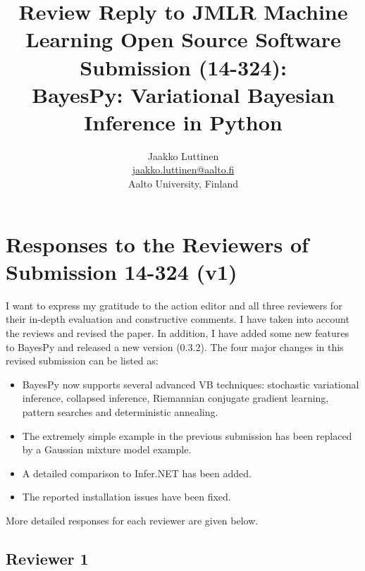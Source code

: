 \documentclass{article}
\title{Review Reply to JMLR Machine Learning Open Source Software Submission (14-324):\\
BayesPy: Variational Bayesian Inference in Python}
\author{Jaakko Luttinen\\
  \url{jaakko.luttinen@aalto.fi}\\
    Aalto University, Finland}
\begin{document}
\maketitle

\section{Responses to the Reviewers of Submission 14-324 (v1)}

I want to express my gratitude to the action editor and all three reviewers for
their in-depth evaluation and constructive comments.  I have taken into account
the reviews and revised the paper.  In addition, I have added some new features
to BayesPy and released a new version (0.3.2).  The four major changes in this
revised submission can be listed as:
\begin{itemize}

\item BayesPy now supports several advanced VB techniques: stochastic
  variational inference, collapsed inference, Riemannian conjugate gradient
  learning, pattern searches and deterministic annealing.

\item The extremely simple example in the previous submission has been replaced
  by a Gaussian mixture model example.

\item A detailed comparison to Infer.NET has been added.

\item The reported installation issues have been fixed.

\end{itemize}
More detailed responses for each reviewer are given below.







\subsection{Reviewer 1}
\end{document}
